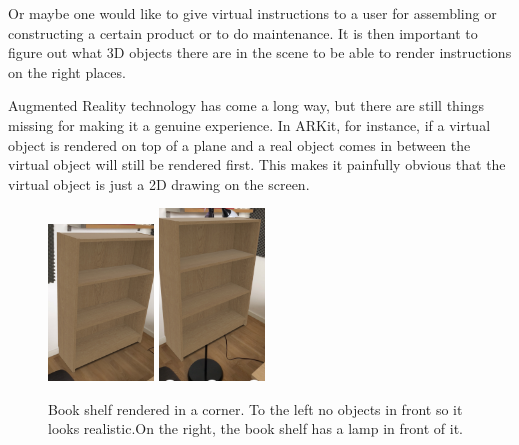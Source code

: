 Or maybe one would like to give virtual instructions to a user for assembling or constructing a certain 
product or to do maintenance. It is then important to figure out what 3D objects there are in the scene to 
be able to render instructions on the right places.

Augmented Reality technology has come a long way, but there are still things missing for making it a 
genuine experience. In ARKit, for instance, if a virtual object is rendered on top of a plane and a real 
object comes in between the virtual object will still be rendered first. This makes it painfully obvious that 
the virtual object is just a 2D drawing on the screen.

\begin{figure}[hbtp]
\begin{center}
\includegraphics[width = 0.25\textwidth]{./Images/overlapping2.jpg} 
\includegraphics[width = 0.25\textwidth]{./Images/overlapping1.jpg} 
\caption{Book shelf rendered in a corner. To the left no objects in front so it looks realistic.On the right, the book shelf has a lamp in front of it.}
\end{center}
\end{figure}

\newpage
